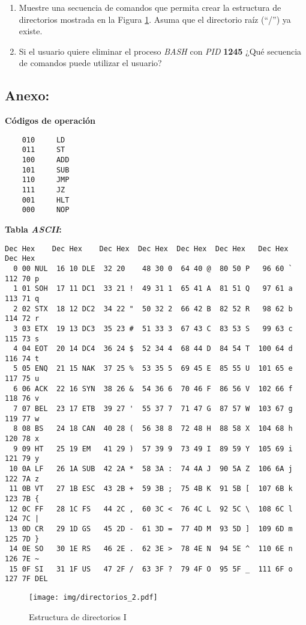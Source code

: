 \documentclass[12pt]{article}
\begin{document}
\begin{enumerate}
    \item Muestre una secuencia de comandos que permita crear la estructura de
    directorios mostrada en la Figura \ref{directorios}. Asuma que el
    directorio raíz (“/”) ya existe.

    \item Si el usuario quiere eliminar el proceso \emph{BASH} con \emph{PID}
        \textbf{1245} ¿Qué secuencia de comandos puede utilizar el usuario?

\end{enumerate}

\subsection*{ \large\textbf{Anexo:} }

\textbf{Códigos de operación}

\begin{verbatim}
    010     LD
    011     ST
    100     ADD
    101     SUB
    110     JMP
    111     JZ
    001     HLT
    000     NOP
\end{verbatim}

\textbf{Tabla \emph{ASCII}:}

\begin{verbatim}
Dec Hex    Dec Hex    Dec Hex  Dec Hex  Dec Hex  Dec Hex   Dec Hex   Dec Hex
  0 00 NUL  16 10 DLE  32 20    48 30 0  64 40 @  80 50 P   96 60 `  112 70 p
  1 01 SOH  17 11 DC1  33 21 !  49 31 1  65 41 A  81 51 Q   97 61 a  113 71 q
  2 02 STX  18 12 DC2  34 22 "  50 32 2  66 42 B  82 52 R   98 62 b  114 72 r
  3 03 ETX  19 13 DC3  35 23 #  51 33 3  67 43 C  83 53 S   99 63 c  115 73 s
  4 04 EOT  20 14 DC4  36 24 $  52 34 4  68 44 D  84 54 T  100 64 d  116 74 t
  5 05 ENQ  21 15 NAK  37 25 %  53 35 5  69 45 E  85 55 U  101 65 e  117 75 u
  6 06 ACK  22 16 SYN  38 26 &  54 36 6  70 46 F  86 56 V  102 66 f  118 76 v
  7 07 BEL  23 17 ETB  39 27 '  55 37 7  71 47 G  87 57 W  103 67 g  119 77 w
  8 08 BS   24 18 CAN  40 28 (  56 38 8  72 48 H  88 58 X  104 68 h  120 78 x
  9 09 HT   25 19 EM   41 29 )  57 39 9  73 49 I  89 59 Y  105 69 i  121 79 y
 10 0A LF   26 1A SUB  42 2A *  58 3A :  74 4A J  90 5A Z  106 6A j  122 7A z
 11 0B VT   27 1B ESC  43 2B +  59 3B ;  75 4B K  91 5B [  107 6B k  123 7B {
 12 0C FF   28 1C FS   44 2C ,  60 3C <  76 4C L  92 5C \  108 6C l  124 7C |
 13 0D CR   29 1D GS   45 2D -  61 3D =  77 4D M  93 5D ]  109 6D m  125 7D }
 14 0E SO   30 1E RS   46 2E .  62 3E >  78 4E N  94 5E ^  110 6E n  126 7E ~
 15 0F SI   31 1F US   47 2F /  63 3F ?  79 4F O  95 5F _  111 6F o  127 7F DEL
\end{verbatim}

\begin{figure}

    \centering

    \texttt{[image: img/directorios\_2.pdf]}

    \caption{Estructura de directorios I}

    \label{directorios}

\end{figure}
\end{document}
